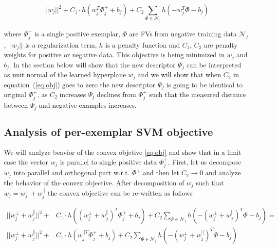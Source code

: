 \documentclass[table]{article} %
\begin{document}
		\begin{equation}
	        ||w_j||^{2} +C_1 \cdot h
	        				\left(
	        				w_j^T\Phi^+_j+b_j
	        				\right)
	                         +C_2\sum_{\Phi\in \mathcal N_j}h
	                         \left(
	                         -w_j^T\Phi-b_j
	                         \right) 	
	       	\label{eq:obj} 
	  	\end{equation}

	  	where $\Phi^+_j$ is a single positive exemplar, $\Phi$ are FVs from negative training data $\mathcal N_j$, $||w_j||$ is a regularization term, $h$ is a penalty function and $C_1$, $C_2$ are penalty weights for positive or negative data. This objective is being minimized in $w_j$ and $b_j$. In the section below will show that the new descriptor $\Psi_j$ can be interpreted as unit normal of the learned hyperplane $w_j$ and we will show that when $C_2$ in equation~(\ref{eq:obj}) goes to zero the new descriptor $\Psi_j$ is going to be identical to original $\Phi_j^+$, as $C_2$ increases $\Psi_j$ declines from $\Phi_j^+$ such that the measured distance between $\Psi_j$ and negative examples increases.
	
	
	\subsection*{Analysis of per-exemplar SVM objective} \vspace{-0.2cm} 		
		We will analyze beavior of the convex objetive \eqref{eq:obj} and show that in a limit case the vector $w_j$ is parallel to single positive data $\Phi_j^+$. First, let us decompose $w_j$ into parallel and orthogonal part w.r.t. $\Phi^+$ and then let $C_2\rightarrow 0$ and analyze the behavior of the convex objective. After decomposition of $w_j$ such that $w_j=w_j^{\perp}+w_j^{||}$ the convex objective can be re-written as follows

	  	\begin{align}
	  		\nonumber
	        ||w_j^{\perp}+w_j^{||}||^{2} +&
	        C_1 \cdot h
	        \left(
	        	(w_j^{\perp}+w_j^{||})^T\Phi^+_j+b_j
	        \right)+
	        C_2\sum_{\Phi\in \mathcal N_j} h
	        \left(
	        	-(w_j^{\perp}+w_j^{||})^T\Phi-b_j
	        \right)
	        = \\ 
	        ||w_j^{\perp}+w_j^{||}||^{2} +&
	        C_1 \cdot h
	        \left(
	        	w_j^{||T}\Phi^+_j+b_j
	        \right)+
	        C_2\sum_{\Phi\in \mathcal N_j} h
	        \left(
	        	-(w_j^{\perp}+w_j^{||})^T\Phi-b_j
	        \right)	
	       	\label{eq:decomposed} 
	  	\end{align}	
\end{document}
